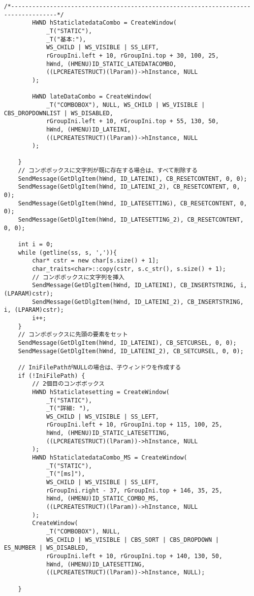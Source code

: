 \begin{lstlisting}[caption=window.cpp]
		/*-----------------------------------------------------------------------------------*/
		HWND hStaticlatedataCombo = CreateWindow(
			_T("STATIC"),
			_T("基本:"),
			WS_CHILD | WS_VISIBLE | SS_LEFT,
			rGroupIni.left + 10, rGroupIni.top + 30, 100, 25,
			hWnd, (HMENU)ID_STATIC_LATEDATACOMBO,
			((LPCREATESTRUCT)(lParam))->hInstance, NULL
		);

		HWND lateDataCombo = CreateWindow(
			_T("COMBOBOX"), NULL, WS_CHILD | WS_VISIBLE | CBS_DROPDOWNLIST | WS_DISABLED,
			rGroupIni.left + 10, rGroupIni.top + 55, 130, 50,
			hWnd, (HMENU)ID_LATEINI,
			((LPCREATESTRUCT)(lParam))->hInstance, NULL
		);

	}
	// コンボボックスに文字列が既に存在する場合は、すべて削除する
	SendMessage(GetDlgItem(hWnd, ID_LATEINI), CB_RESETCONTENT, 0, 0);
	SendMessage(GetDlgItem(hWnd, ID_LATEINI_2), CB_RESETCONTENT, 0, 0);
	SendMessage(GetDlgItem(hWnd, ID_LATESETTING), CB_RESETCONTENT, 0, 0);
	SendMessage(GetDlgItem(hWnd, ID_LATESETTING_2), CB_RESETCONTENT, 0, 0);

	int i = 0;
	while (getline(ss, s, ',')){
		char* cstr = new char[s.size() + 1];
		char_traits<char>::copy(cstr, s.c_str(), s.size() + 1);
		// コンボボックスに文字列を挿入
		SendMessage(GetDlgItem(hWnd, ID_LATEINI), CB_INSERTSTRING, i, (LPARAM)cstr);
		SendMessage(GetDlgItem(hWnd, ID_LATEINI_2), CB_INSERTSTRING, i, (LPARAM)cstr);
		i++;
	}
	// コンボボックスに先頭の要素をセット
	SendMessage(GetDlgItem(hWnd, ID_LATEINI), CB_SETCURSEL, 0, 0);
	SendMessage(GetDlgItem(hWnd, ID_LATEINI_2), CB_SETCURSEL, 0, 0);

	// IniFilePathがNULLの場合は、子ウィンドウを作成する
	if (!IniFilePath) {
		// 2個目のコンボボックス
		HWND hStaticlatesetting = CreateWindow(
			_T("STATIC"),
			_T("詳細: "),
			WS_CHILD | WS_VISIBLE | SS_LEFT,
			rGroupIni.left + 10, rGroupIni.top + 115, 100, 25,
			hWnd, (HMENU)ID_STATIC_LATESETTING,
			((LPCREATESTRUCT)(lParam))->hInstance, NULL
		);
		HWND hStaticlatedataCombo_MS = CreateWindow(
			_T("STATIC"),
			_T("[ms]"),
			WS_CHILD | WS_VISIBLE | SS_LEFT,
			rGroupIni.right - 37, rGroupIni.top + 146, 35, 25,
			hWnd, (HMENU)ID_STATIC_COMBO_MS,
			((LPCREATESTRUCT)(lParam))->hInstance, NULL
		);
		CreateWindow(
			_T("COMBOBOX"), NULL,
			WS_CHILD | WS_VISIBLE | CBS_SORT | CBS_DROPDOWN | ES_NUMBER | WS_DISABLED,
			rGroupIni.left + 10, rGroupIni.top + 140, 130, 50,
			hWnd, (HMENU)ID_LATESETTING,
			((LPCREATESTRUCT)(lParam))->hInstance, NULL);

	}


\end{lstlisting}
